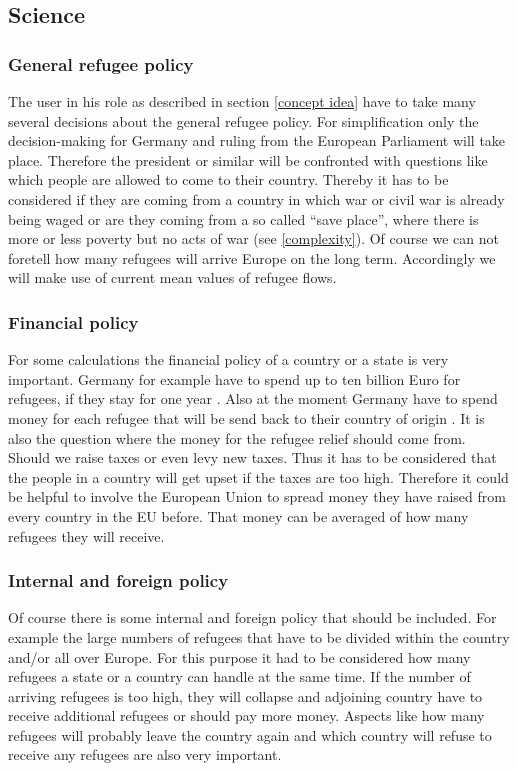 \documentclass{acm_proc_article-sp}
\begin{document}
\subsection{Science}
\subsubsection*{\textbf{General refugee policy}}
The user in his role as described in section \ref{concept idea} have to take many several decisions about the general refugee policy. For simplification only the decision-making for Germany and ruling from the European Parliament will take place. Therefore the president or similar will be confronted with questions like which people are allowed to come to their country. Thereby it has to be considered if they are coming from a country in which war or civil war is already being waged or are they coming from a so called ``save place'', where there is more or less poverty but no acts of war (see \ref{complexity}). Of course we can not foretell how many refugees will arrive Europe on the long term. Accordingly we will make use of current mean values of refugee flows. 


\subsubsection*{\textbf{Financial policy}}
For some calculations the financial policy of a country or a state is very important. Germany for example have to spend up to ten billion Euro for refugees, if they stay for one year \cite{finanzen}. Also at the moment Germany have to spend money for each refugee that will be send back to their country of origin \cite{auswanderung}. It is also the question where the money for the refugee relief should come from. Should we raise taxes or even levy new taxes. Thus it has to be considered that the people in a country will get upset if the taxes are too high. Therefore it could be helpful to involve the European Union to spread money they have raised from every country in the EU before. That money can be averaged of how many refugees they will receive. 

\subsubsection*{\textbf{Internal and foreign policy}}
Of course there is some internal and foreign policy that should be included. For example the large numbers of refugees that have to be divided within the country and/or all over Europe. For this purpose it had to be considered how many refugees a state or a country can handle at the same time. If the number of arriving refugees is too high, they will collapse and adjoining country have to receive additional refugees or should pay more money. Aspects like how many refugees will probably leave the country again and which country will refuse to receive any refugees are also very important.
\end{document}
